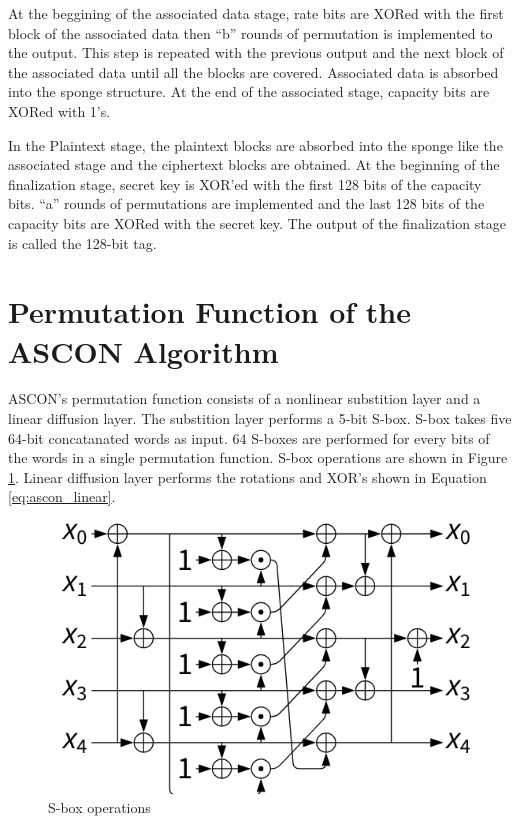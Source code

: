 At the beggining of the associated data stage, rate bits are XORed with the first block of the associated data then “b” rounds of permutation is implemented to the output. This step is repeated with the previous output and the next block of the associated data until all the blocks are covered. Associated data is absorbed into the sponge structure. At the end of the associated stage, capacity bits are XORed with 1’s.

In the Plaintext stage, the plaintext blocks are absorbed into the sponge like the associated stage and the ciphertext blocks are obtained. At the beginning of the finalization stage, secret key is XOR'ed with the first 128 bits of the capacity bits. “a” rounds of permutations are implemented and the last 128 bits of the capacity bits are XORed with the secret key. The output of the finalization stage is called the 128-bit tag. 

\section{Permutation Function of the ASCON Algorithm}


ASCON’s permutation function consists of a nonlinear substition layer and a linear diffusion layer. The substition layer performs a 5-bit S-box. S-box takes five 64-bit concatanated words as input. 64 S-boxes are performed for every bits of the words in a single permutation function. S-box operations are shown in Figure \ref{fig:sbox_operations}. Linear diffusion layer performs the rotations and XOR's shown in Equation \ref{eq:ascon_linear}.

\begin{figure}
    \centering
    \includegraphics[scale = 0.6]{ascon_sbox/s_box_ascon.png}
    \caption{S-box operations}
    \label{fig:sbox_operations}
\end{figure}

